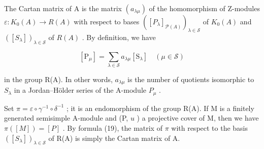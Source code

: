 The Cartan matrix of A is the matrix \((a_{\lambda\mu})\) of the homomorphism of Z-modules \(\varepsilon: K_{0}(A) \to R(A)\) with respect to bases \(([P_{\lambda}]_{\mathcal{P}(A)})_{\lambda \in \mathcal{S}}\) of \(K_{0}(A)\) and \(([S_{\lambda}])_{\lambda \in \mathcal{S}}\) of \(R(A)\) . By definition, we have

\[
[ \mathrm{P} _ {\mu} ] = \sum_ {\lambda \in \mathcal {S}} a _ {\lambda \mu} [ \mathrm{S} _ {\lambda} ] \quad (\mu \in \mathcal {S})\tag{19}
\]

in the group R(A). In other words, \(a_{\lambda\mu}\) is the number of quotients isomorphic to \(S_{\lambda}\) in a Jordan--Hölder series of the A-module \(P_{\mu}\) .

Set \(\pi = \varepsilon \circ \gamma^{-1} \circ \delta^{-1}\) ; it is an endomorphism of the group R(A). If M is a finitely generated semisimple A-module and (P, \(u\) ) a projective cover of M, then we have \(\pi([M]) = [P]\) . By formula (19), the matrix of \(\pi\) with respect to the basis \(([S_{\lambda}])_{\lambda \in \mathcal{S}}\) of R(A) is simply the Cartan matrix of A.

